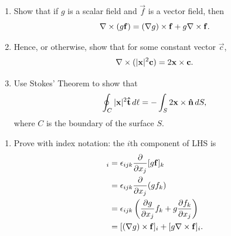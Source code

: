 \documentclass[10pt, a4paper]{article}
\begin{document}
\begin{problem}[$2009$ Question $5$]\phantom{}
    \begin{enumerate}[label = (\alph*)]
        \item Show that if $g$ is a scalar field and $\vec{f}$ is a vector field,
        then
        \[
        \mathbf{\nabla} \times (g\mathbf{f}) = (\mathbf{\nabla} g)\times\mathbf{f} + g\mathbf{\nabla} \times \mathbf{f}.
        \]

        \item Hence,
        or otherwise,
        show that for some constant vector $\vec{c}$,
        \[
        \mathbf{\nabla} \times (|\mathbf{x}| ^ 2\mathbf{c}) = 2\mathbf{x} \times \mathbf{c}.
        \]

        \item Use Stokes' Theorem to show that
        \[
        \oint_{C}|\mathbf{x}| ^ 2\mathbf{\hat{t}}\,d\ell = -\int_{S}2\mathbf{x} \times \mathbf{\hat{n}}\,dS,
        \]
        where $C$ is the boundary of the surface $S$.
    \end{enumerate}

    \begin{solution}\phantom{}
        \begin{enumerate}[label = (\alph*)]
            \item
            Prove with index notation:
            the $i$th component of LHS is
            \begin{align*}
                [\bnabla \times (g\vec{f})]_i &= \epsilon_{ijk}\pd{x_j}[g\vec{f}]_k \\
                &= \epsilon_{ijk}\pd{x_j}(gf_k) \\
                &= \epsilon_{ijk}\left(\pd[g]{x_j}f_k + g\pd[f_k]{x_j}\right) \\
                &= [(\bnabla g) \times \vec{f}]_i + [g\bnabla \times \vec{f}]_i.
            \end{align*}


\end{enumerate}
\end{solution}
\end{problem}
\end{document}

